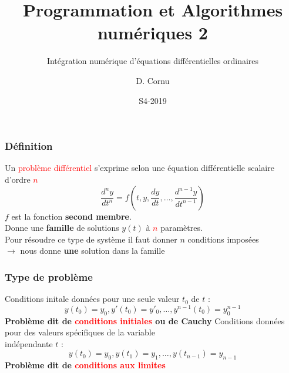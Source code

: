 \documentclass{beamer}
\title[\textcolor{white}{PAN-2}]{Programmation et Algorithmes numériques 2}
\subtitle[\textcolor{white}{PAN-2}]{\large Intégration numérique d'équations différentielles ordinaires}
\author{D. Cornu}
\date{S4-2019}
\begin{document}
\begin{frame}
\titlepage
\end{frame}


\begin{frame}
\frametitle{Définition}
Un \textcolor{red}{problème différentiel} s'exprime selon une équation différentielle scalaire d'ordre \textcolor{red}{$n$}
\vspace{0.4cm}
\begin{equation*}
	\frac{d^{n}y}{dt^{n}} = f\left( t,y,\frac{dy}{dt},\dots,\frac{d^{n-1}y}{dt^{n-1}} \right)
\end{equation*}
\vspace{0.3cm} 
$f$ est la fonction \textbf{second membre}.\\
\vspace{0.5cm}
Donne une \textbf{famille} de solutions $y(t)$ à \textcolor{red}{$n$} paramètres.\\
\vspace{0.5cm}
Pour résoudre ce type de système il faut donner $n$ conditions imposées\\
$\rightarrow$ nous donne \textbf{une} solution dans la famille
\end{frame}


\begin{frame}
\frametitle{Type de problème}
Conditions initale données pour une seule valeur $t_0$ de $t$ :
\begin{equation*}
	y(t_0) = y_0 , y'(t_0) = y'_0, \dots ,y^{n-1}(t_0)=y_0^{n-1}
\end{equation*}
\textbf{Problème dit de \textcolor{red}{conditions initiales} ou de Cauchy}
\vfill
\hrulefill
\vfill
Conditions données pour des valeurs spécifiques de la variable\\ indépendante $t$ :
\begin{equation*}
	y(t_0) = y_0, y(t_1) = y_1, \dots , y(t_{n-1}) = y_{n-1}
\end{equation*}
\textbf{Problème dit de \textcolor{red}{conditions aux limites}}
\end{frame}
\end{document}
